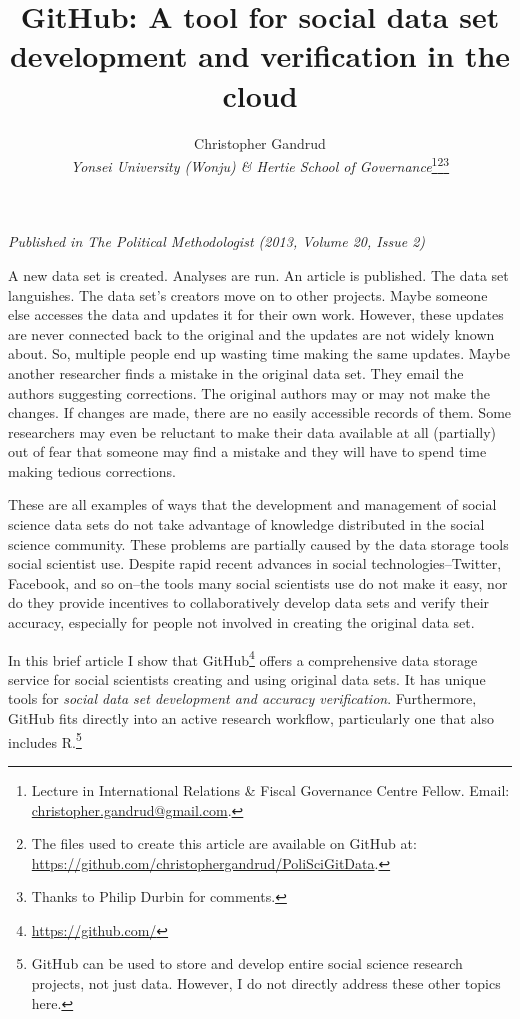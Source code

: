 \documentclass[twocolumn]{article}\usepackage{graphicx, color}
\title{GitHub: A tool for social data set development and verification in the cloud}
\author{Christopher Gandrud \\
                {\emph{Yonsei University (Wonju) \& Hertie School of Governance}}\footnote{Lecture in International Relations \& Fiscal Governance Centre Fellow. Email: \href{mailto:christopher.gandrud@gmail.com}{christopher.gandrud@gmail.com}.}\footnote{The files used to create this article are available on GitHub at: \url{https://github.com/christophergandrud/PoliSciGitData}.}\footnote{Thanks to Philip Durbin for comments.}}
\begin{document}
\maketitle

\emph{Published in The Political Methodologist (2013, Volume 20, Issue 2)}

\vspace{0.5cm}

A new data set is created. Analyses are run. An article is published. The data set languishes. The data set's creators move on to other projects. Maybe someone else accesses the data and updates it for their own work. However, these updates are never connected back to the original and the updates are not widely known about. So, multiple people end up wasting time making the same updates. Maybe another researcher finds a mistake in the original data set. They email the authors suggesting corrections. The original authors may or may not make the changes. If changes are made, there are no easily accessible records of them. Some researchers may even be reluctant to make their data available at all (partially) out of fear that someone may find a mistake and they will have to spend time making tedious corrections. 

These are all examples of ways that the development and management of social science data sets do not take advantage of knowledge distributed in the social science community. These problems are partially caused by the data storage tools social scientist use. Despite rapid recent advances in social technologies--Twitter, Facebook, and so on--the tools many social scientists use do not make it easy, nor do they provide incentives to collaboratively develop data sets and verify their accuracy, especially for people not involved in creating the original data set.

In this brief article I show that GitHub\footnote{\url{https://github.com/}} offers a comprehensive data storage service for social scientists creating and using original data sets. It has unique tools for \emph{social data set development and accuracy verification}. Furthermore, GitHub fits directly into an active research workflow, particularly one that also includes R.\footnote{GitHub can be used to store and develop entire social science research projects, not just data. However, I do not directly address these other topics here.}
\end{document}
